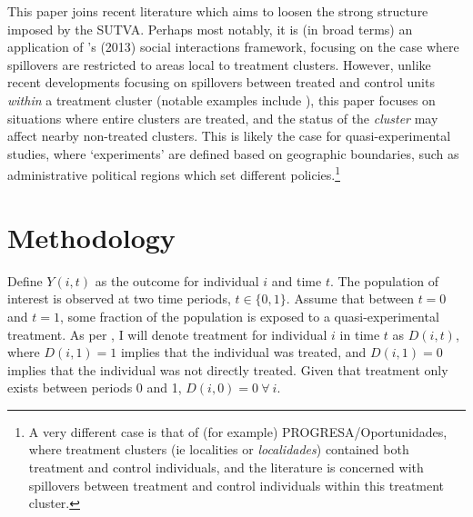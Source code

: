This paper joins recent literature which aims to loosen the strong structure 
imposed by the SUTVA.  Perhaps most notably, it is (in broad terms) an 
application of \citeauthor{Manski2013}'s (2013) social interactions framework, 
focusing on the case where spillovers are restricted to areas local to treatment 
clusters.  However, unlike recent developments focusing on spillovers 
between treated and control units \emph{within} a treatment cluster (notable
examples include \citet{McIntosh2008,Bairdetal2014,AngelucciDiMaro2010}), this 
paper focuses on situations where entire clusters are treated, and the status
of the \emph{cluster} may affect nearby non-treated clusters.  This is likely
the case for quasi-experimental studies, where `experiments' are defined based
on geographic boundaries, such as administrative political regions which set 
different policies.\footnote{A very different case is that of (for example)
PROGRESA/Oportunidades, where treatment clusters (ie localities or 
\emph{localidades}) contained both treatment and control individuals, and the
literature is concerned with spillovers between treatment and control individuals
within this treatment cluster.}

\nocite{AngelucciDeGiorgi2009} \nocite{Heckmanetal1998}
\nocite{MiguelKremer2004}
 \nocite{Heckmanetal1998b}

\section{Methodology}
Define $Y(i,t)$ as the outcome for individual $i$ and time $t$.  The population
of interest is observed at two time periods, $t\in \{0,1\}$. Assume that between
$t=0$ and $t=1$, some fraction of the population is exposed to a 
quasi-experimental treatment.  As per \citet{Abadie2005}, I will denote 
treatment for individual $i$ in time $t$ as $D(i,t)$, where $D(i,1)=1$ implies 
that the individual was treated, and $D(i,1)=0$ implies that the individual was
not directly treated.  Given that treatment only exists between periods 0 and 1,
$D(i,0)=0\ \forall\ i$.

